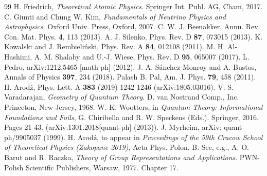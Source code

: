 \documentclass[12pt]{article}
\begin{document}
\begin{thebibliography}{99}
  H. Friedrich, {\it Theoretical Atomic Physics}. Springer Int. Publ. AG, Cham, 2017. 
 C. Giunti and Chung W. Kim, {\it Fundamentals of Neutrino Physics and Astrophysics}. Oxford Univ. Press, Oxford, 2007. 
 C. W. J. Beenakker, Annu. Rev.  Con. Mat. Phys. {\bf 4}, 113 (2013). 
 A. J. Silenko, Phys. Rev. D {\bf 87}, 073015 (2013).
  K. Kowalski and J. Rembieli\'nski, Phys. Rev. A {\bf 84}, 012108 (2011). 
  M. H. Al-Hashimi, A. M. Shalaby and U.-J. Wiese, Phys. Rev. D {\bf 95}, 065007 (2017).
 L. Pedro, arXiv:1212.5465 [math-ph] (2012). 
 J. A. S\'anchez-Monroy and A. Bustos, Annals of Physics {\bf 397}, 234 (2018). 
  Palash B. Pal, Am. J. Phys. {\bf 79}, 458 (2011). 
 H. Arod\'z,  Phys. Lett. A {\bf 383} (2019) 1242-1246 (arXiv:1805.03016).
 V. S.  Varadarajan, {\it Geometry of Quantum Theory}. D. van Nostrand Comp., Inc. Princeton, New Jersey, 1968. 
 W. K. Wootters,  in {\it Quantum Theory: Informational Foundations and Foils},  G. Chiribella and R. W. Speckens (Eds.).  Springer, 2016. Pages 21-43. (arXiv:1301.2018[quant-ph] (2013)).  
 J. Myrheim,  arXiv: quant-ph/9905037 (1999). 
  H. Arod\'z, to appear in {\it Proceedings of the 59th Cracow School of Theoretical Physics (Zakopane 2019)},  Acta Phys. Polon. B.  
 See, e.g.,  A. O. Barut and R.  Raczka, {\it Theory of Group Representations and Applications}. PWN-Polish Scientific Publishers, Warsaw, 1977.  Chapter 17. 
\end{thebibliography}
 
\end{document}
